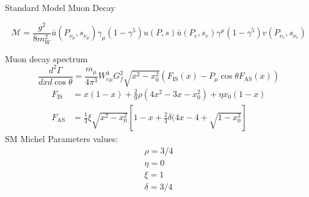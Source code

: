 \documentclass[11pt]{beamer}
\numberwithin{equation}{section}
\begin{document}
\begin{frame}{Standard Model Muon Decay}
\begin{figure}[H]
\centering
{}
\end{figure}
\pause
 \begin{equation*}
 \mathcal{M}=\frac{g^2}{8m_W^2}\bar{u}(P_{\nu_\mu},s_{\nu_\mu}) \gamma_\mu(1-\gamma^5)u(P,s)\bar{u}(P_e,s_e)\gamma^\mu(1-\gamma^5)v(P_{\nu_e},s_{\nu_e})
 \end{equation*}
\end{frame}

\begin{frame}{Muon decay spectrum}
\begin{equation*}
\frac{d^2\Gamma}{dxd\cos\theta}=\frac{m_\mu}{4\pi^3} W_{e\mu}^4G_f^2\sqrt{x^2-x_0^2}\left(F_{\text{IS}}(x)-P_\mu\cos\theta F_{\text{AS}}(x)\right)
\label{eq:Diffrate}
\end{equation*}
\pause
\begin{align*}
F_\text{IS}&=x(1-x)+\frac{2}{9}\rho(4x^2-3x-x_0^2)+\eta x_0(1-x)\\
F_\text{AS}&=\frac{1}{3}\xi\sqrt{x^2-x_0^2}\left[1-x+\frac{2}{3}\delta(4x-4+\sqrt{1-x_0^2}\right]
\end{align*} 
\pause
SM Michel Parameters values:
\begin{align*}
\rho=3/4\\
\eta = 0\\
\xi = 1\\
\delta = 3/4
\end{align*}
\end{frame}
\end{document}
